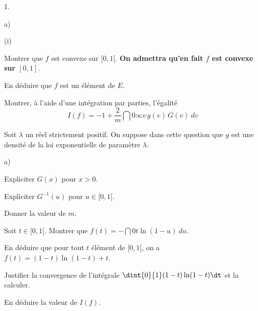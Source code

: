 \documentclass[11pt]{article}%
\begin{document}
\begin{noliste}{1.}
\begin{noliste}{a)}
\begin{nonoliste}{(i)}
   

   
   
   
   
   
   
   \item Montrer que $f$ est convexe sur $[0,1[$. \textbf{On admettra 
   qu'en fait $f$ est convexe sur $[0,1]$}. 
   
   
   
   \item En déduire que $f$ est un élément de $E$.
   
   
  \end{nonoliste}
  
  \item Montrer, à l'aide d'une intégration par parties, l'égalité
  \[
   I(f)= -1+\dfrac{2}{m} \dint{0}{\infty} v \, g(v) \, G(v) \ dv
  \]
  
  

 \end{noliste}
 
 
 
 
 \item Soit $\lambda$ un réel strictement positif. On suppose dans 
 cette question que $g$ est une densité de la loi exponentielle de 
 paramètre $\lambda$.
 \begin{noliste}{a)}
  \setlength{\itemsep}{2mm}
  \item Expliciter $G(x)$ pour $x >0$. 
  
  
  
  \item Expliciter $G^{-1}(u)$ pour $u \in [0,1[$. 
  
  

  
  \item Donner la valeur de $m$. 
  
  

  
  \item Soit $t \in[0,1[$. Montrer que $f(t)= - \dint{0}{t} \ln(1-u) 
  \ du.$
  
  

  
  
  
  
  \item En déduire que pour tout $t$ élément de $[0,1[$, on a $f(t)= 
  (1-t)\ln(1-t)+t$. 
  
  
  
  
  
  

  
  \item Justifier la convergence de l'intégrale $\dint{0}{1} 
  (1-t)\ln(1-t) \dt$ et la calculer. 
  
  
  
  \item En déduire la valeur de $I(f)$.
  
  
 \end{noliste}
\end{noliste}
\end{document}
